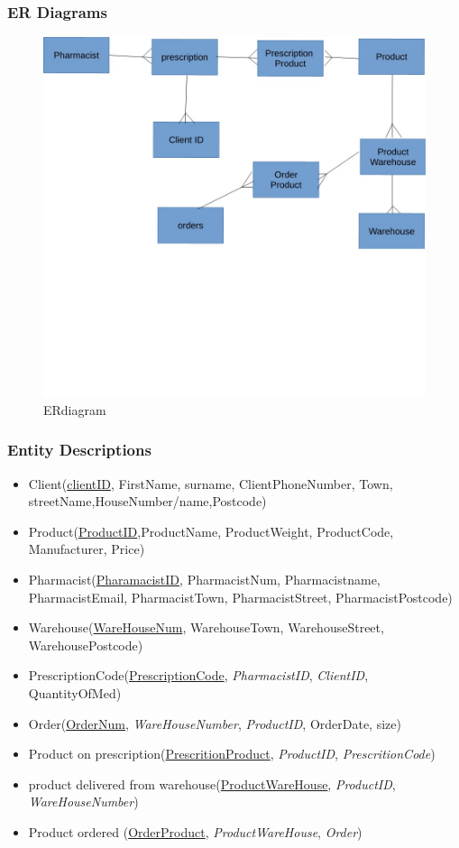 \subsubsection{ER Diagrams}
\begin{figure}[H]
\centering
\includegraphics[trim = 0mm 100mm 0mm 0mm, clip, width=140mm, scale=2]{ERdiagram.JPG}
\caption{ERdiagram \label{overflow}}
\end{figure}
\subsubsection{Entity Descriptions}
\begin{itemize}
\item Client(\underline{clientID}, FirstName, surname, ClientPhoneNumber, Town, streetName,HouseNumber/name,Postcode)
\item Product(\underline{ProductID},ProductName, ProductWeight, ProductCode, Manufacturer, Price)
\item Pharmacist(\underline{PharamacistID}, PharmacistNum, Pharmacistname,
PharmacistEmail, PharmacistTown, PharmacistStreet, PharmacistPostcode)
\item Warehouse(\underline{WareHouseNum}, WarehouseTown, WarehouseStreet, WarehousePostcode)
\item PrescriptionCode(\underline{PrescriptionCode}, \emph{PharmacistID}, \emph{ClientID}, QuantityOfMed)
\item Order(\underline{OrderNum}, \emph{WareHouseNumber}, \emph{ProductID}, OrderDate, size)
\item Product on prescription(\underline{PrescritionProduct}, \emph{ProductID}, \emph{PrescritionCode})
\item product delivered from warehouse(\underline{ProductWareHouse}, \emph{ProductID}, \emph{WareHouseNumber})
\item Product ordered (\underline{OrderProduct}, \emph{ProductWareHouse}, \emph{Order})


\end{itemize}
